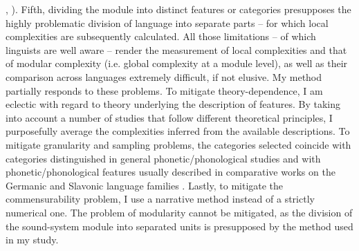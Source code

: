 \documentclass[output=paper,hidelinks]{langscibook}
\begin{document}
\citealt[30]{miestamo_complexity_2006, miestamo_feasibility_2006, miestamo_grammatical_2008}, \citeyear[83]{miestamo_implicational_2009}). Fifth, dividing the module into distinct features or categories presupposes the highly problematic division of language into separate parts -- for which local complexities are subsequently calculated. All those limitations -- of which linguists are well aware -- render the measurement of local complexities and that of modular complexity (i.e. global complexity at a module level), as well as their comparison across languages extremely difficult, if not elusive. My method partially responds to these problems. To mitigate theory-dependence, I am eclectic with regard to theory underlying the description of features. By taking into account a number of studies that follow different theoretical principles, I purposefully average the complexities inferred from the available descriptions. To mitigate granularity and sampling problems, the categories selected coincide with categories distinguished in general phonetic/phonological studies and with phonetic/phonological features usually described in comparative works on the Germanic and Slavonic language families \citep{rothstein_polish_1993, jacobs_yiddish_1994, sussex_slavic_2006, harbert_germanic_2007}. Lastly, to mitigate the commensurability problem, I use a narrative method instead of a strictly numerical one. The problem of modularity cannot be mitigated, as the division of the sound-system module into separated units is presupposed by the method used in my study.
\end{document}
